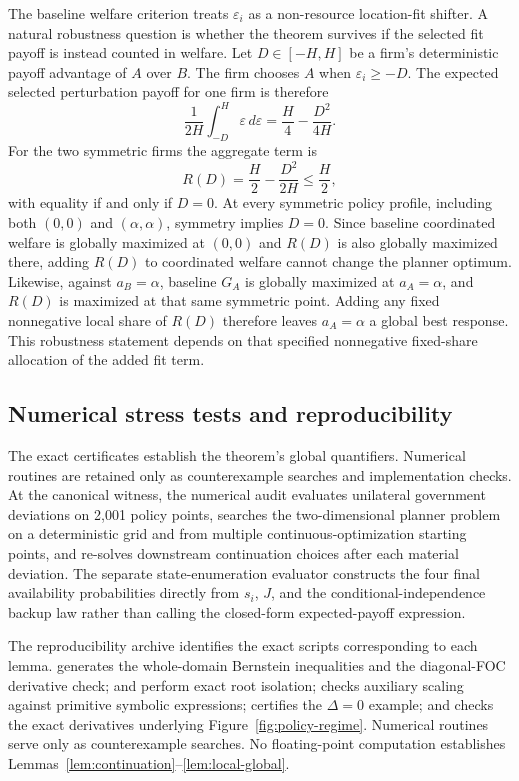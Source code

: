 The baseline welfare criterion treats $\varepsilon_i$ as a non-resource location-fit shifter. A natural robustness question is whether the theorem survives if the selected fit payoff is instead counted in welfare. Let $D\in[-H,H]$ be a firm's deterministic payoff advantage of $A$ over $B$. The firm chooses $A$ when $\varepsilon_i\ge -D$. The expected selected perturbation payoff for one firm is therefore
\begin{equation}
\frac{1}{2H}\int_{-D}^{H}\varepsilon\,d\varepsilon
=\frac H4-\frac{D^2}{4H}.
\end{equation}
For the two symmetric firms the aggregate term is
\begin{equation}
R(D)=\frac H2-\frac{D^2}{2H}\leq \frac H2,
\label{eq:fit-payoff}
\end{equation}
with equality if and only if $D=0$. At every symmetric policy profile, including both $(0,0)$ and $(\alpha,\alpha)$, symmetry implies $D=0$. Since baseline coordinated welfare is globally maximized at $(0,0)$ and $R(D)$ is also globally maximized there, adding $R(D)$ to coordinated welfare cannot change the planner optimum. Likewise, against $a_B=\alpha$, baseline $G_A$ is globally maximized at $a_A=\alpha$, and $R(D)$ is maximized at that same symmetric point. Adding any fixed nonnegative local share of $R(D)$ therefore leaves $a_A=\alpha$ a global best response. This robustness statement depends on that specified nonnegative fixed-share allocation of the added fit term.

\subsection{Numerical stress tests and reproducibility}\label{app:continuation}

The exact certificates establish the theorem's global quantifiers. Numerical routines are retained only as counterexample searches and implementation checks. At the canonical witness, the numerical audit evaluates unilateral government deviations on 2,001 policy points, searches the two-dimensional planner problem on a deterministic grid and from multiple continuous-optimization starting points, and re-solves downstream continuation choices after each material deviation. The separate state-enumeration evaluator constructs the four final availability probabilities directly from $s_i$, $J$, and the conditional-independence backup law rather than calling the closed-form expected-payoff expression.

The reproducibility archive identifies the exact scripts corresponding to each lemma.  generates the whole-domain Bernstein inequalities and the diagonal-FOC derivative check;  and  perform exact root isolation;  checks auxiliary scaling against primitive symbolic expressions;  certifies the $\Delta=0$ example; and  checks the exact derivatives underlying Figure~\ref{fig:policy-regime}. Numerical routines serve only as counterexample searches. No floating-point computation establishes Lemmas~\ref{lem:continuation}--\ref{lem:local-global}.

